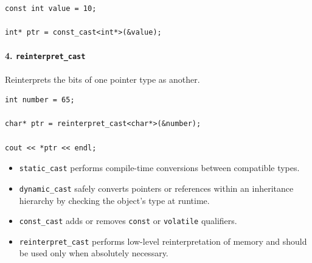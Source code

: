 \documentclass[10pt]{article}
\begin{document}
\begin{verbatim}
const int value = 10;

int* ptr = const_cast<int*>(&value);
\end{verbatim}

\newpage 
\paragraph{4. \texttt{reinterpret\_cast}}
Reinterprets the bits of one pointer type as another.

\begin{verbatim}
int number = 65;

char* ptr = reinterpret_cast<char*>(&number);

cout << *ptr << endl;
\end{verbatim}

\begin{itemize}
    \item \verb|static_cast| performs compile-time conversions between compatible types.

    \item \verb|dynamic_cast| safely converts pointers or references within an inheritance hierarchy by checking the object's type at runtime.

    \item \verb|const_cast| adds or removes \verb|const| or \verb|volatile| qualifiers.

    \item \verb|reinterpret_cast| performs low-level reinterpretation of memory and should be used only when absolutely necessary.
\end{itemize}

\newpage
\end{document}

